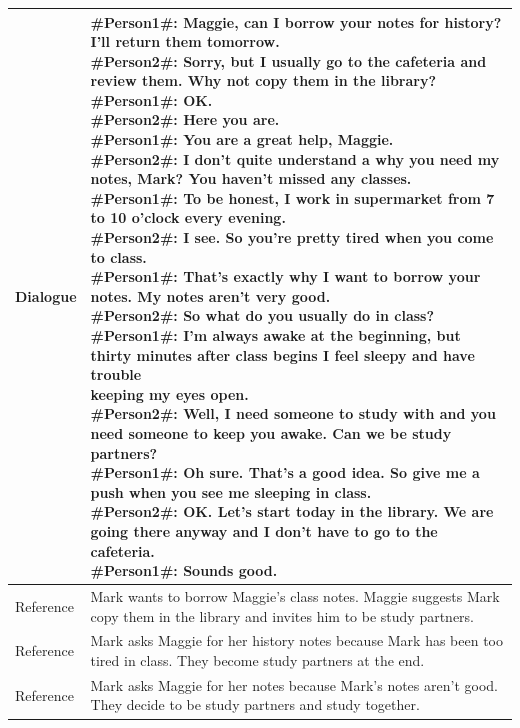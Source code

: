 \documentclass[letterpaper]{article} %
\begin{document}
\begin{table}
	\centering
	\small
	\begin{tabular}{p{1.5cm}p{14.5cm}}
		\toprule[1pt]
		
		Dialogue & \makecell[l]{\#Person1\#: Maggie, can I borrow your notes for history? I'll return them tomorrow.\\
		\#Person2\#: Sorry, but I usually go to the cafeteria and review them. Why not copy them in the library?\\
		\#Person1\#: OK.\\
		\#Person2\#: Here you are.\\
		\#Person1\#: You are a great help, Maggie.\\
		\#Person2\#: I don't quite understand a why you need my notes, Mark? You haven't missed any classes.\\
		\#Person1\#: To be honest, I work in supermarket from 7 to 10 o'clock every evening.\\
		\#Person2\#: I see. So you're pretty tired when you come to class.\\
		\#Person1\#: That's exactly why I want to borrow your notes. My notes aren't very good.\\
		\#Person2\#: So what do you usually do in class?\\
		\#Person1\#: I'm always awake at the beginning, but thirty minutes after class begins I feel sleepy and have trouble \\\quad\quad\quad\quad\quad keeping my eyes open.\\
		\#Person2\#: Well, I need someone to study with and you need someone to keep you awake. Can we be study\\ \quad\quad\quad\quad\quad partners?\\
		\#Person1\#: Oh sure. That's a good idea. So give me a push when you see me sleeping in class.\\
		\#Person2\#: OK. Let's start today in the library. We are going there anyway and I don't have to go to the cafeteria.\\
		\#Person1\#: Sounds good.}\\
		\hline
		Reference\-1 & Mark wants to borrow Maggie's class notes. Maggie suggests Mark copy them in the library and invites him to be study partners. \\
				\hline
		Reference\-2 & Mark asks Maggie for her history notes because Mark has been too tired in class. They become study partners at the end. \\
				\hline
		Reference\-3 & Mark asks Maggie for her notes because Mark's notes aren't good. They decide to be study partners and study together. \\

\end{tabular}
\end{table}
\end{document}
